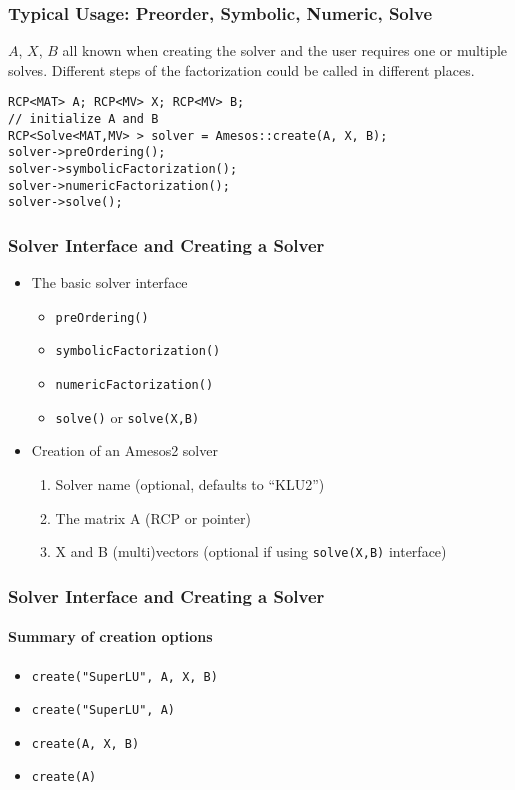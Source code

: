 \documentclass[xcolor=dvipsnames]{beamer}
\begin{document}
\begin{frame}[fragile]
  \frametitle{Typical Usage: Preorder, Symbolic, Numeric, Solve}

  $A$, $X$, $B$ all known when creating the solver and the user
  requires one or multiple solves. Different steps of the
  factorization could be called in different places.

  \begin{lstlisting}
RCP<MAT> A; RCP<MV> X; RCP<MV> B;
// initialize A and B
RCP<Solve<MAT,MV> > solver = Amesos::create(A, X, B);
solver->preOrdering();
solver->symbolicFactorization();
solver->numericFactorization();
solver->solve();
  \end{lstlisting}
\end{frame}

\begin{frame}
  \frametitle{Solver Interface and Creating a Solver}
  \begin{itemize}
  \item The basic solver interface
    \begin{itemize}
    \item \texttt{preOrdering()}
    \item \texttt{symbolicFactorization()}
    \item \texttt{numericFactorization()}
    \item \texttt{solve()} or \texttt{solve(X,B)}
    \end{itemize}
  \item Creation of an Amesos2 solver
    \begin{enumerate}
    \item Solver name (optional, defaults to ``KLU2'')
    \item The matrix A (RCP or pointer)
    \item X and B (multi)vectors (optional if using \texttt{solve(X,B)} interface)
    \end{enumerate}
  \end{itemize}
\end{frame}

\begin{frame}
  \frametitle{Solver Interface and Creating a Solver}
  \framesubtitle{Summary of creation options}
  \begin{itemize}
  \item \texttt{create("SuperLU", A, X, B)}
  \item \texttt{create("SuperLU", A)}
  \item \texttt{create(A, X, B)}
  \item \texttt{create(A)}
  \end{itemize}
\end{frame}
\end{document}
